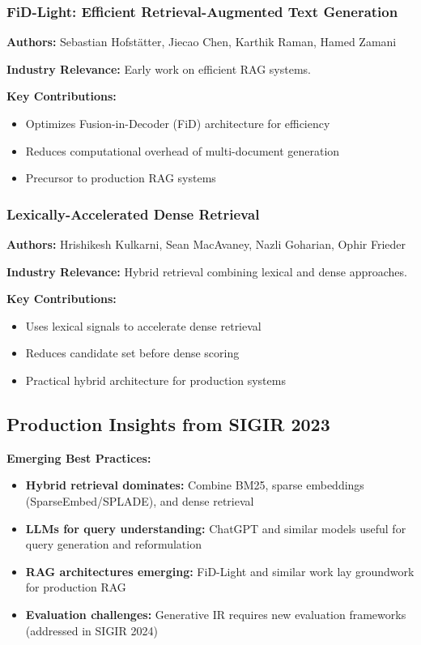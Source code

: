 \documentclass[11pt,letterpaper]{article}
\begin{document}
\subsubsection{FiD-Light: Efficient Retrieval-Augmented Text Generation}
\textbf{Authors:} Sebastian Hofstätter, Jiecao Chen, Karthik Raman, Hamed Zamani

\textbf{Industry Relevance:} Early work on efficient RAG systems.

\textbf{Key Contributions:}
\begin{itemize}[leftmargin=*]
    \item Optimizes Fusion-in-Decoder (FiD) architecture for efficiency
    \item Reduces computational overhead of multi-document generation
    \item Precursor to production RAG systems
\end{itemize}

\subsubsection{Lexically-Accelerated Dense Retrieval}
\textbf{Authors:} Hrishikesh Kulkarni, Sean MacAvaney, Nazli Goharian, Ophir Frieder

\textbf{Industry Relevance:} Hybrid retrieval combining lexical and dense approaches.

\textbf{Key Contributions:}
\begin{itemize}[leftmargin=*]
    \item Uses lexical signals to accelerate dense retrieval
    \item Reduces candidate set before dense scoring
    \item Practical hybrid architecture for production systems
\end{itemize}

\subsection{Production Insights from SIGIR 2023}

\textbf{Emerging Best Practices:}
\begin{itemize}[leftmargin=*]
    \item \textbf{Hybrid retrieval dominates:} Combine BM25, sparse embeddings (SparseEmbed/SPLADE), and dense retrieval
    \item \textbf{LLMs for query understanding:} ChatGPT and similar models useful for query generation and reformulation
    \item \textbf{RAG architectures emerging:} FiD-Light and similar work lay groundwork for production RAG
    \item \textbf{Evaluation challenges:} Generative IR requires new evaluation frameworks (addressed in SIGIR 2024)
\end{itemize}
\end{document}
